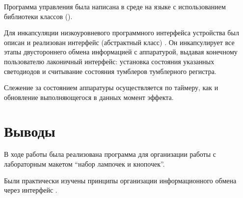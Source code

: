 Программа управления была написана в среде  на языке  с использованием библиотеки классов  ().

Для инкапсуляции низкоуровневого программного интерфейса устройства был описан и реализован интерфейс (абстрактный класс) . Он инкапсулирует все этапы двустороннего обмена информацией с аппаратурой, выдавая конечному пользователю лаконичный интерфейс: установка состояния указанных светодиодов и считывание состояния тумблеров тумблерного регистра.

Слежение за состоянием аппаратуры осуществляется по таймеру, как и обновление выполняющегося в данных момент эффекта.

\section{Выводы}

В ходе работы была реализована программа для организации работы с лабораторным макетом \enquote{набор лампочек и кнопочек}.

Были практически изучены принципы организации информационного обмена через интерфейс .
